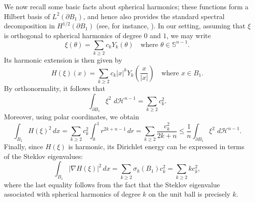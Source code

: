 \documentclass[oneside,a4paper,11pt,notitlepage]{article}
\newcommand{\abs}[1]{{\left|#1\right|}}
\newcommand{\dH}{\,d\mathcal{H}^{n-1}}
\theoremstyle{definition}
\theoremstyle{plain}
\theoremstyle{definition}
\begin{document}
We now recall some basic facts about spherical harmonics; these functions form a Hilbert basis of $L^2(\partial B_1)$, and hence also provides the standard spectral decomposition in $H^{1/2}(\partial B_1)$ (see, for instance, \cite[Remark 4.1]{BDR}).
In our setting, assuming that $\xi$ is orthogonal to spherical harmonics of degree $0$ and $1$, we may write
\begin{equation*}
    \xi(\theta)=\sum_{k\geq2}c_k Y_k(\theta)\quad\text{where }\theta\in\mathbb{S}^{n-1}.
\end{equation*}
Its harmonic extension is then given by
\begin{equation*}
    H(\xi)(x)=\sum_{k\geq2}c_k\abs{x}^kY_k\left(\frac{x}{\abs{x}}\right)\quad\text{where }x\in B_1.
\end{equation*}
By orthonormality, it follows that
\begin{equation*}
\int_{\partial B_1}\xi^2\,\dH=\sum_{k\geq2} c_{k}^2.
\end{equation*}
Moreover, using polar coordinates, we obtain
\begin{equation*}
\int_{B_1}H(\xi)^2\,dx
=\sum_{k\geq2} c_{k}^2\int_0^1 r^{2k+n-1}\,dr=\sum_{k\geq2}\frac{c_{k}^2}{2k+n}\leq\frac{1}{n}\int_{\partial B_1}\xi^2\,\dH.
\end{equation*}
Finally, since $H(\xi)$ is harmonic, its Dirichlet energy can be expressed in terms of the Steklov eigenvalues:
\[
\int_{B_1} \abs{\nabla H(\xi)}^2\,dx=\sum_{k\geq2}\sigma_k(B_1)c_{k}^2=\sum_{k\geq2}kc_{k}^2,
\]
where the last equality follows from the fact that the Steklov eigenvalue associated with spherical harmonics of degree $k$ on the unit ball is precisely $k$.
\end{document}
